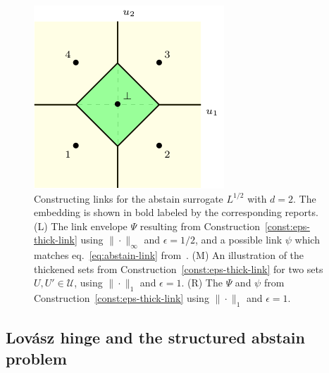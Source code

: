 \documentclass[11pt]{article}
\newcommand{\U}{\mathcal{U}}
\begin{document}
\begin{figure}
\begin{center}
\begin{minipage}{0.32\linewidth}
\end{minipage}\hfill
\begin{minipage}{0.32\linewidth}
\includegraphics[width=\linewidth]{tikz/abstain-link-l1.pdf}
\end{minipage}\hfill
\caption{Constructing links for the abstain surrogate $L^{1/2}$ with $d=2$. The embedding is shown in bold labeled by the corresponding reports. (L) The link envelope $\Psi$ resulting from Construction~\ref{const:eps-thick-link} using $\|\cdot\|_\infty$ and $\epsilon = 1/2$, and a possible link $\psi$ which matches eq.~\eqref{eq:abstain-link} from~\cite{ramaswamy2018consistent}.  (M) An illustration of the thickened sets from Construction~\ref{const:eps-thick-link} for two sets $U, U' \in \U$, using $\|\cdot\|_1$ and $\epsilon = 1$. (R) The $\Psi$ and $\psi$ from Construction~\ref{const:eps-thick-link} using $\|\cdot\|_1$ and $\epsilon = 1$.}
\label{fig:abstain-links}
\end{center}
\end{figure}


\subsection{Lov\'asz hinge and the structured abstain problem}
\label{sec:lovasz-hinge}

\newcommand{\dis}{\mathrm{dis}}
\newcommand{\abs}{\mathrm{abs}}
\end{document}
